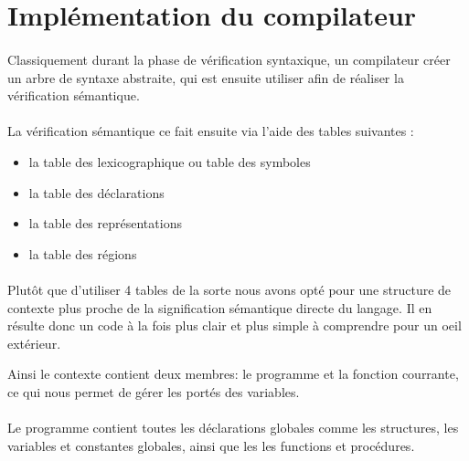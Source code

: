 \section{Implémentation du compilateur}

\paragraph{}Classiquement durant la phase de vérification syntaxique, un compilateur créer un
arbre de syntaxe abstraite, qui est ensuite utiliser afin de réaliser la vérification sémantique.


\paragraph{}La vérification sémantique ce fait ensuite via l'aide des tables suivantes :

\begin{itemize}
 \item la table des lexicographique ou table des symboles
 \item la table des déclarations
 \item la table des représentations
 \item la table des régions
\end{itemize}

\paragraph{}Plutôt que d'utiliser 4 tables de la sorte nous avons opté pour une structure de contexte
plus proche de la signification sémantique directe du langage.
Il en résulte donc un code à la fois plus clair et plus simple à comprendre pour un oeil extérieur.

Ainsi le contexte contient deux membres: le programme et la fonction courrante, ce qui nous permet de 
gérer les portés des variables.

\paragraph{}Le programme contient toutes les déclarations globales comme les structures, les variables
et constantes globales, ainsi que les les functions et procédures.

